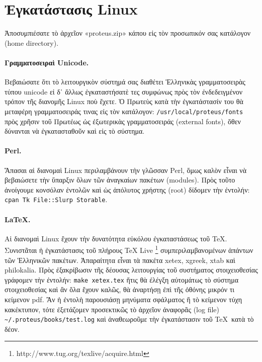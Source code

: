 \documentclass[12pt,a4paper]{article}
\begin{document}
\section{Ἐγκατάστασις Linux}
    Ἀποσυμπιέσατε τὸ ἀρχεῖον «proteus.zip» κάπου εἰς τὸν προσωπικόν σας
    κατάλογον (home directory).

    \paragraph{Γραμματοσειραὶ Unicode.}
      Βεβαιώσατε ὅτι τὸ λειτουργικὸν σύστημά σας διαθέτει Ἑλληνικὰς
      γραμματοσειρὰς τύπου unicode εἰ δ᾽ ἄλλως ἐγκαταστήσατὲ τες
      συμφώνως πρὸς τὸν ἐνδεδειγμένον τρόπον τῆς διανομῆς Linux
      ποὺ ἔχετε. Ὁ Πρωτεὺς κατὰ τὴν ἐγκατάστασίν του θὰ μεταφέρη
      γραμματοσειράς τινας εἰς τὸν κατάλογον: {\tt /usr/local/proteus/fonts}
      πρὸς χρῆσιν τοῦ Πρωτέως ὡς ἐξωτερικὰς γραμματοσειράς (external fonts),
      ὅθεν δύνανται νὰ ἐγκατασταθοῦν καὶ εἰς τὸ σύστημα.

    \paragraph{Perl.}
      Ἅπασαι αἱ διανομαὶ Linux περιλαμβάνουν τὴν γλῶσσαν Perl,
      ὅμως καλὸν εἶναι νὰ βεβαιώσετε τὴν ὕπαρξιν ὅλων τῶν ἀναγκαίων
      πακέτων (modules). Πρὸς τοῦτο ἀνοίγουμε κονσόλαν ἐντολῶν
      καὶ ὡς ἀπόλυτος χρήστης (root)
      δίδομεν τὴν  ἐντολήν: {\tt cpan Tk File::Slurp Storable}.
    \paragraph{\LaTeX.}
      Αἱ διανομαὶ Linux ἔχουν τὴν δυνατότητα εὐκόλου ἐγκαταστάσεως τοῦ
      \TeX.  Συνιστᾶται  ἡ ἐγκατάστασις τοῦ πλήρους TeX Live
      \footnote{http://www.tug.org/texlive/acquire.html}
      συμπεριλαμβανομένων ἁπάντων τῶν Ἑλληνικῶν πακέτων.
      Ἀπαραίτητα εἶναι τὰ πακέτα xetex, xgreek, xtab καὶ philokalia.
      Πρὸς ἐξακρίβωσιν τῆς δέουσας λειτουργίας τοῦ συστήματος στοιχειοθεσίας
      γράφομεν τὴν ἐντολήν: {\tt make xetex.tex} ἥτις θὰ ἐλέγξη αὐτομάτως
      τὸ σύστημα στοιχειοθεσίας καὶ ἂν ὅλα ἔχουν καλῶς,
      θὰ ἀναρτήσῃ ἐπὶ τῆς ὀθόνης μικρόν τι κείμενον pdf.
      Ἂν ἡ ἐντολὴ παρουσιάσῃ μηνύματα σφάλματος ἢ τὸ κείμενον
      τύχη κακέκτυπον, τότε ἐξετάζομεν προσεκτικῶς τὸ ἀρχεῖον
      ἀναφορᾶς (log file) {\tt \~{}/.proteus/books/test.log} καὶ ἀναθεωροῦμε
      τὴν ἐγκατάστασιν τοῦ \TeX\ κατὰ τὸ δέον.
\end{document}
